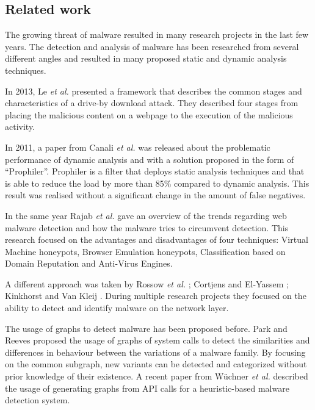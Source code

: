 \pagebreak
\restoregeometry


\subsection{Related work}

The growing threat of malware resulted in many research projects in the last few years. The detection and analysis of malware has been researched from several different angles \cite{auto_malware,Chang2013} and resulted in many proposed static and dynamic analysis techniques.

In 2013, Le \textit{et al.} \cite{Le2013} presented a framework that describes the common stages and characteristics of a drive-by download attack. They described four stages from placing the malicious content on a webpage to the execution of the malicious activity.

In 2011, a paper from Canali \textit{et al.} \cite{Canali2011} was released about the problematic performance of dynamic analysis and with a solution proposed in the form of ``Prophiler''. Prophiler is a filter that deploys static analysis techniques and that is able to reduce the load by more than 85\% compared to dynamic analysis. This result was realised without a significant change in the amount of false negatives.

In the same year Rajab \textit{et al.} \cite{Rajab11trendsin} gave an overview of the trends regarding web malware detection and how the malware tries to circumvent detection. This research focused on the advantages and disadvantages of four techniques: Virtual Machine honeypots, Browser Emulation honeypots, Classification based on Domain Reputation and Anti-Virus Engines.

A different approach was taken by Rossow \textit{et al.} \cite{Rossow2011}; Cortjens and El-Yassem \cite{Cortjens2012}; Kinkhorst and Van Kleij \cite{Kinkhorst2009}. During multiple research projects they focused on the ability to detect and identify malware on the network layer.

The usage of graphs to detect malware has been proposed before. Park and Reeves proposed \cite{Park2011} the usage of graphs of system calls to detect the similarities and differences in behaviour between the variations of a malware family. By focusing on the common subgraph, new variants can be detected and categorized without prior knowledge of their existence. A recent paper  from W\"{u}chner \textit{et al.} \cite{Wuchner2014} described the usage of generating graphs from API calls for a heuristic-based malware detection system.

